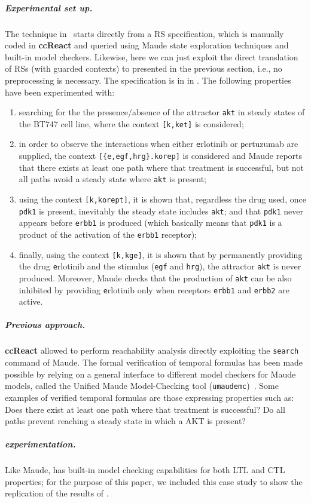 \subparagraph*{Experimental set up.}
The technique in~\cite{DBLP:conf/cmsb/BallisBFO24} starts directly from a RS specification, which is manually coded in \textbf{ccReact} and queried using Maude state exploration techniques and built-in model checkers. Likewise, here we can just exploit the direct translation of RSs (with guarded contexts) to \GROOVE presented in the previous section, i.e., no preprocessing is necessary. The \BioResolve specification is in  in .
The following properties have been experimented with:
\begin{enumerate}
\item searching for the the presence/absence of the attractor \texttt{akt} in steady states of the BT747 cell line, where the context \verb=[k,ket]= is considered;
\item in order to observe the interactions when either \texttt{e}rlotinib or \texttt{p}ertuzumab are supplied, the context \verb=[{e,egf,hrg}.korep]= is considered and Maude reports that there exists at least one path where that treatment is successful, but not all paths avoid a steady state where \texttt{akt} is present;
\item using the context \verb=[k,korept]=, it is shown that, regardless the drug used, once \texttt{pdk1} is present, inevitably the steady state includes \texttt{akt}; and that \texttt{pdk1} never appears before \texttt{erbb1} is produced (which basically means that \texttt{pdk1} is a product of the activation of the \texttt{erbb1} receptor);
\item finally, using the context \verb=[k,kge]=, it is shown that by permanently providing the drug \texttt{e}rlotinib and the stimulus (\texttt{egf} and \texttt{hrg}), the attractor \texttt{akt} is never produced. Moreover, Maude checks that the production of \texttt{akt} can be also inhibited by providing \texttt{e}rlotinib only when receptors \texttt{erbb1} and \texttt{erbb2} are active.
\end{enumerate}

\subparagraph*{Previous approach.}
\textbf{ccReact} allowed to perform reachability analysis directly exploiting the \texttt{search} command of Maude. 
The formal verification of temporal formulas has been made possible by relying on a general interface to different model checkers for Maude models, called the Unified Maude Model-Checking tool (\texttt{umaudemc})~\cite{DBLP:journals/jlap/RubioMPV21}.
Some examples of verified temporal formulas are those expressing properties such as:
Does there exist at least one path where that treatment is successful?
Do all paths prevent reaching a steady state in which a AKT is present?

\subparagraph*{\GROOVE experimentation.}

Like Maude, \GROOVE has built-in model checking capabilities for both LTL and CTL properties; for the purpose of this paper, we included this case study to show the replication of the results of \cite{DBLP:conf/cmsb/BallisBFO24}.


